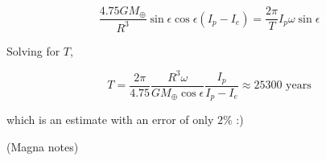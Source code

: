 \documentclass[11pt]{article}
\begin{document}
\begin{pproblem}
\begin{pssolution*}{}{}
\begin{alternativas}
            \[\frac{4.75GM_\oplus}{R^3}\sin\epsilon\cos\epsilon (I_{p}-I_{e}) = \frac{2\pi}{T}I_p\omega\sin\epsilon\]

            Solving for \(T\),

            \[\boxed{T = \frac{2\pi}{4.75}\frac{R^3\omega}{GM_\oplus\cos\epsilon}\frac{I_p}{I_p-I_e}\approx 25300\text{ years}}\]

            which is an estimate with an error of only \(2\%\) :)
        
        \end{alternativas}
    \end{pssolution*}

    \begin{pproblem}{}
        (Magna notes)
        
    \end{pproblem}
\end{pproblem}
    
\end{document}
